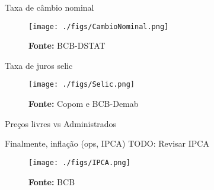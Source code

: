 \documentclass[presentation]{beamer}
\begin{document}
\begin{frame}[label={sec:org4fdeb90}]{Taxa de câmbio nominal}
\begin{figure}[htb]
\centering
\caption{ Índice da taxa de câmbio efetiva nominal\\Jun/1994=100 } 
\texttt{[image: ./figs/CambioNominal.png]}
\label{fig:cambio}
\caption*{\textbf{Fonte:} BCB-DSTAT}
\end{figure}
\end{frame}


\begin{frame}[label={sec:org369fbfb}]{Taxa de juros selic}
\begin{figure}[htb]
\centering
\caption{Taxa de juros selic a.a. (efetivo x meta)\\Anualizada base 252} 
\texttt{[image: ./figs/Selic.png]}
\label{fig:Selic}
\caption*{\textbf{Fonte:} Copom e BCB-Demab}
\end{figure}
\end{frame}


\begin{frame}[label={sec:org36b6308}]{Preços livres vs Administrados}
\end{frame}

\begin{frame}[label={sec:org92537eb}]{Finalmente, inflação (ops, IPCA)}
\alert{TODO:} Revisar IPCA

\begin{figure}[htb]
\centering
\caption{IPCA e Metas para Inflação} 
\texttt{[image: ./figs/IPCA.png]}
\label{fig:IPCA}
\caption*{\textbf{Fonte:} BCB}
\end{figure}
\end{frame}
\end{document}
